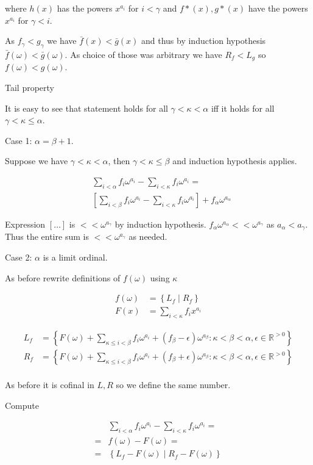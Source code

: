 \documentclass{article}
\newcommand{\brac}[1]{\left[ #1 \right]}
\newcommand{\curly}[1]{\left\{ #1 \right\}}
\newcommand{\R}{\mathbb{R}}
\newcommand{\w}{\omega}
\begin{document}
where $h(x)$ has the powers $x^{a_i}$ for $i < \gamma$ and $f*(x), g*(x)$ have the powers $x^{a_i}$ for $\gamma < i$.

As $f_\gamma < g_\gamma$ we have $\bar f(x) < \bar g(x)$ and thus by induction hypothesis $\bar f(\w) < \bar g(\w)$. As choice of those was arbitrary we have $R_f < L_g$ so $f(\w) < g(\w)$.

Tail property

It is easy to see that statement holds for all $\gamma < \kappa < \alpha$ iff it holds for all $\gamma < \kappa \leq \alpha$.

Case 1: $\alpha = \beta + 1$.

Suppose we have $\gamma < \kappa < \alpha$, then $\gamma < \kappa \leq \beta$ and induction hypothesis applies.

\begin{align*}
	&\sum_{i < \alpha} f_i \w^{a_i} - \sum_{i < \kappa} f_i \w^{a_i} = \\
	&\brac{\sum_{i < \beta} f_i \w^{a_i} - \sum_{i < \kappa} f_i \w^{a_i}} + f_\alpha \w^{a_\alpha}
\end{align*}

Expression $\brac{\ldots}$ is $<< \w^{a_\gamma}$ by induction hypothesis. $f_\alpha \w^{a_\alpha} << \w^{a_\gamma}$ as $a_\alpha < a_\gamma$. Thus the entire sum is $<< \w^{a_\gamma}$ as needed.

Case 2: $\alpha$ is a limit ordinal.

As before rewrite definitions of $f(\w)$ using $\kappa$

\begin{align*}
  f(\w) &= \curly{L_f \mid R_f} \\
  F(x) &= \sum_{i < \kappa} f_i x^{a_i}
\end{align*}

\begin{align*}
  L_f &= \curly{F(\w) + \sum_{\kappa \leq i < \beta} f_i \w^{a_i} + (f_\beta - \epsilon) \w^{a_\beta}
	\colon \kappa < \beta < \alpha, \epsilon \in \R^{>0}} \\
  R_f &= \curly{F(\w) + \sum_{\kappa \leq i < \beta} f_i \w^{a_i} + (f_\beta + \epsilon) \w^{a_\beta}
	\colon \kappa < \beta < \alpha, \epsilon \in \R^{>0}} \\
\end{align*}

As before it is cofinal in $L, R$ so we define the same number.

Compute

\begin{align*}
  &\sum_{i < \alpha} f_i \w^{a_i} - \sum_{i < \kappa} f_i \w^{a_i} = \\
	= &f(\w) - F(\w) = \\
	= &\curly{L_f - F(\w) \mid R_f - F(\w)}
\end{align*}
\end{document}

